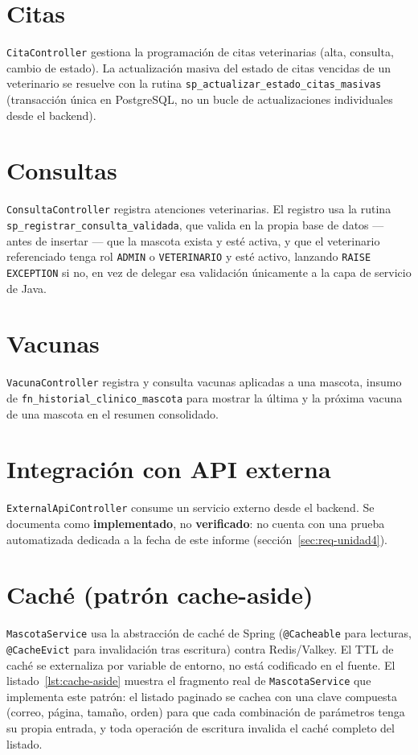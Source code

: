 \section{Citas}

\texttt{CitaController} gestiona la programaci\'on de citas veterinarias
(alta, consulta, cambio de estado). La actualizaci\'on masiva del estado de
citas vencidas de un veterinario se resuelve con la rutina
\texttt{sp\_actualizar\_estado\_citas\_masivas} (transacci\'on \'unica en
PostgreSQL, no un bucle de actualizaciones individuales desde el backend).

\section{Consultas}

\texttt{ConsultaController} registra atenciones veterinarias. El registro
usa la rutina \texttt{sp\_registrar\_consulta\_validada}, que valida en la
propia base de datos --- antes de insertar --- que la mascota exista y
est\'e activa, y que el veterinario referenciado tenga rol
\texttt{ADMIN} o \texttt{VETERINARIO} y est\'e activo, lanzando
\texttt{RAISE EXCEPTION} si no, en vez de delegar esa validaci\'on
\'unicamente a la capa de servicio de Java.

\section{Vacunas}

\texttt{VacunaController} registra y consulta vacunas aplicadas a una
mascota, insumo de \texttt{fn\_historial\_clinico\_mascota} para mostrar la
\'ultima y la pr\'oxima vacuna de una mascota en el resumen consolidado.

\section{Integraci\'on con API externa}

\texttt{ExternalApiController} consume un servicio externo desde el
backend. Se documenta como \textbf{implementado}, no \textbf{verificado}:
no cuenta con una prueba automatizada dedicada a la fecha de este informe
(secci\'on~\ref{sec:req-unidad4}).

\section{Cach\'e (patr\'on cache-aside)}

\texttt{MascotaService} usa la abstracci\'on de cach\'e de Spring
(\texttt{@Cacheable} para lecturas, \texttt{@CacheEvict} para
invalidaci\'on tras escritura) contra Redis/Valkey. El TTL de cach\'e se
externaliza por variable de entorno, no est\'a codificado en el fuente.
El listado~\ref{lst:cache-aside} muestra el fragmento real de
\texttt{MascotaService} que implementa este patr\'on: el listado paginado
se cachea con una clave compuesta (correo, p\'agina, tama\~no, orden) para
que cada combinaci\'on de par\'ametros tenga su propia entrada, y toda
operaci\'on de escritura invalida el cach\'e completo del listado.

